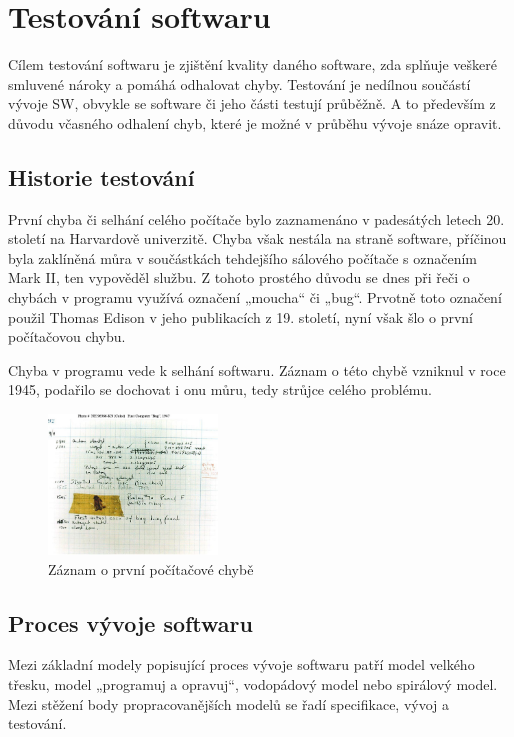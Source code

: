 \chapter{Testování softwaru}
Cílem testování softwaru je zjištění kvality daného software, zda splňuje veškeré smluvené nároky a pomáhá odhalovat chyby. Testování je nedílnou součástí vývoje SW, obvykle se software či jeho části testují průběžně. A to především z důvodu včasného odhalení chyb, které je možné v průběhu vývoje snáze opravit.

\section{Historie testování}
První chyba či selhání celého počítače bylo zaznamenáno v padesátých letech 20. století na Harvardově univerzitě. Chyba však nestála na straně software, příčinou byla zaklíněná můra v součástkách tehdejšího sálového počítače s označením Mark II, ten vypověděl službu. Z tohoto prostého důvodu se dnes při řeči o chybách v programu využívá označení „moucha“ či „bug“. Prvotně toto označení použil Thomas Edison v jeho publikacích z 19. století, nyní však šlo o první počítačovou chybu. 

Chyba v programu vede k selhání softwaru. Záznam o této chybě vzniknul v roce 1945, podařilo se dochovat i onu můru, tedy strůjce celého problému.\cite{85SxcMZY6LKfV8v4}


\begin{figure}
	\centering
	\includegraphics[width=0.4\textwidth]{Figures/first-pc-bug.jpg}
	\caption{Záznam o první počítačové chybě \cite{85SxcMZY6LKfV8v4}}
	\label{fig:WritingThesis}
\end{figure}

\section{Proces vývoje softwaru}
Mezi základní modely popisující proces vývoje softwaru patří model velkého třesku, model „programuj a opravuj“, vodopádový model nebo spirálový model. Mezi stěžení body propracovanějších modelů se řadí specifikace, vývoj a testování.

